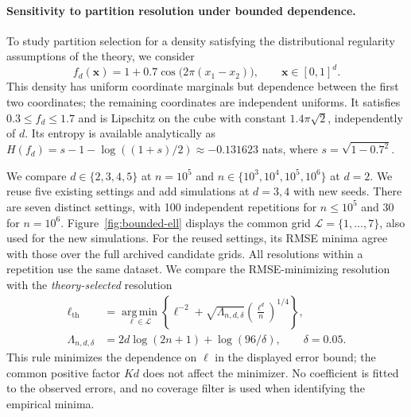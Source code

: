 
\paragraph{Sensitivity to partition resolution under bounded dependence.}
To study partition selection for a density satisfying the distributional
regularity assumptions of the theory, we consider
\begin{equation}
f_d(\mathbf{x})=1+0.7\cos\!\bigl(2\pi(x_1-x_2)\bigr),
\qquad \mathbf{x}\in[0,1]^d.
\label{eq:bounded-dependent-density}
\end{equation}
This density has uniform coordinate marginals but dependence between the
first two coordinates; the remaining coordinates are independent uniforms.
It satisfies $0.3\le f_d\le1.7$ and is Lipschitz on the cube with constant
$1.4\pi\sqrt{2}$, independently of $d$.
Its entropy is available analytically as
$H(f_d)=s-1-\log((1+s)/2)\approx-0.131623$ nats,
where $s=\sqrt{1-0.7^2}$.

We compare $d\in\{2,3,4,5\}$ at $n=10^5$ and
$n\in\{10^3,10^4,10^5,10^6\}$ at $d=2$.
We reuse five existing settings and add simulations at $d=3,4$ with new seeds.
There are seven distinct settings, with 100 independent repetitions for
$n\le10^5$ and 30 for $n=10^6$.
Figure~\ref{fig:bounded-ell} displays the common grid
$\mathcal{L}=\{1,\ldots,7\}$, also used for the new simulations.
For the reused settings, its RMSE minima agree with those over the full
archived candidate grids.
All resolutions within a repetition use the same dataset.
We compare the RMSE-minimizing resolution with the \emph{theory-selected}
resolution
\begin{equation}
\begin{aligned}
\ell_{\mathrm{th}}
&=\underset{\ell\in\mathcal{L}}{\operatorname{arg\,min}}
\left\{\ell^{-2}+\sqrt{\Lambda_{n,d,\delta}}
\left(\frac{\ell^d}{n}\right)^{1/4}\right\},\\
\Lambda_{n,d,\delta}
&=2d\log(2n+1)+\log(96/\delta),\qquad\delta=0.05.
\end{aligned}
\label{eq:bounded-theory-ell}
\end{equation}
This rule minimizes the dependence on $\ell$ in the displayed error bound;
the common positive factor $Kd$ does not affect the minimizer.
No coefficient is fitted to the observed errors, and no coverage filter is
used when identifying the empirical minima.

